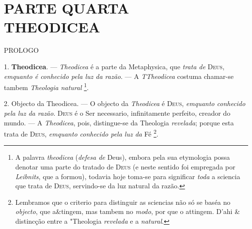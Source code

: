 

\part*{PARTE QUARTA\\[0.3em]\large THEODICEA}

 PROLOGO

1. \textbf{Theodicea}. --- \emph{Theodicea} é a parte da Metaphysica, que \emph{trata de} \textsc{Deus}, \emph{emquanto é conhecido pela luz da razão}. --- A \emph{TTheodicea} costuma chamar-se tambem \emph{Theologia natural} \footnote{A palavra \emph{theodicea} (\emph{defesa de} Deus), embora pela sua etymologia possa denotar uma parte do tratado de \textsc{Deus} (e neste sentido foi empregada por \emph{Leibnits}, que a formou), todavia hoje toma-se para significar \emph{toda} a sciencia que trata de \textsc{Deus}, servindo-se da luz natural da razão.}.

2. Objecto da Theodicea. --- O objecto da \emph{Theodicea} é \textsc{Deus}, \emph{emquanto conhecido pela luz da razão}. \textsc{Deus} é o Ser necessario, infinitamente perfeito, creador do mundo. --- A \emph{Theodicea}, pois, distingue-se da Theologia \emph{revelada}; porque esta trata de \textsc{Deus}, \emph{emquanto conhecido pela luz da} Fé \footnote{Lembramos que o criterio para distinguir as sciencias não só se baséa no \emph{objecto}, que a\&tingem, mas tambem no \emph{modo}, por que o attingem. D'ahi \& distincção entre a "Theologia \emph{revelada} e a \emph{natural}.}.

